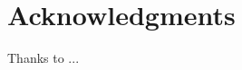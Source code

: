 \documentclass[final,5p,times,twocolumn,authoryear]{elsarticle}
\begin{document}
\section*{Acknowledgments}
Thanks to ...


 







\end{document}
